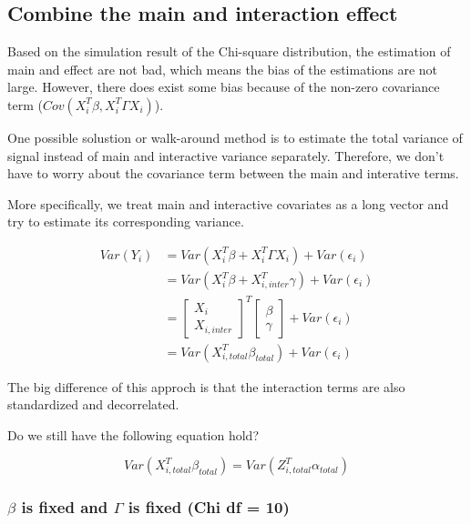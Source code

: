 \documentclass[]{article}
\begin{document}
\newpage

\subsection{Combine the main and interaction
effect}\label{combine-the-main-and-interaction-effect}

Based on the simulation result of the Chi-square distribution, the
estimation of main and effect are not bad, which means the bias of the
estimations are not large. However, there does exist some bias because
of the non-zero covariance term (\(Cov(X_i^T\beta, X_i^T\Gamma X_i)\)).

One possible solustion or walk-around method is to estimate the total
variance of signal instead of main and interactive variance separately.
Therefore, we don't have to worry about the covariance term between the
main and interative terms.

More specifically, we treat main and interactive covariates as a long
vector and try to estimate its corresponding variance.

\begin{align*}
  Var(Y_i) &= Var(X_i^T\beta + X_i^T \Gamma X_i) + Var(\epsilon_i) \\
           &= Var(X_i^T\beta + X_{i,inter}^T \gamma) + Var(\epsilon_i) \\
           &= \begin{bmatrix}   
                  X_i \\        
                  X_{i,inter}   
              \end{bmatrix}^T     
              \begin{bmatrix}
                \beta \\
                \gamma
              \end{bmatrix} + Var(\epsilon_i) \\
           &= Var(X_{i,total}^T \beta_{total}) + Var(\epsilon_i)
\end{align*}

The big difference of this approch is that the interaction terms are
also standardized and decorrelated.

Do we still have the following equation hold?

\[
  Var(X_{i,total}^T \beta_{total}) =  Var(Z_{i,total}^T \alpha_{total}) 
\]

\newpage

\subsubsection{\texorpdfstring{\(\beta\) is fixed and \(\Gamma\) is
fixed (Chi df =
10)}{\textbackslash{}beta is fixed and \textbackslash{}Gamma is fixed (Chi df = 10)}}\label{beta-is-fixed-and-gamma-is-fixed-chi-df-10}
\end{document}
